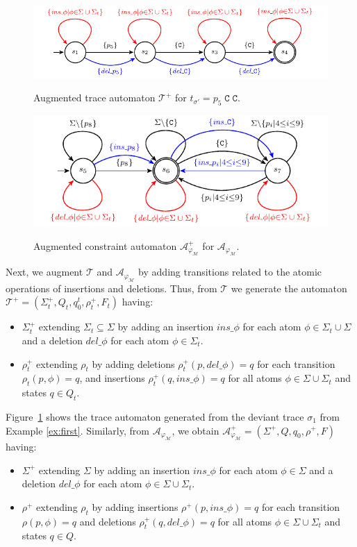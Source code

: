 \begin{figure}[!t]
	\centering
	{\includegraphics[width=.7\textwidth]{images/Tplus}}
	\caption{Augmented trace automaton $\mathcal{T}^+$ for $t_{\sigma'}=p_5\;\texttt{C}\;\texttt{C}$.}\label{fig:tplus}
\end{figure} \begin{figure}[!t]
\centering
{\includegraphics[width=.7\textwidth]{images/Aplus}}
\caption{Augmented constraint automaton $\mathcal{A}_{\varphi_{\mathcal{M}}}^+$ for $\mathcal{A}_{\varphi_{\mathcal{M}}}$.}\label{fig:aplus}
\end{figure}
Next, we augment $\mathcal{T}$ and $\mathcal{A}_{\varphi_{\mathcal{M}}}$ by adding transitions related to the atomic operations of insertions and deletions. Thus, from $\mathcal{T}$ we generate the automaton $\mathcal{T}^+=(\Sigma_t^+,Q_t,q_0^t,\rho_t^+,F_t)$ having:
\begin{itemize}
	\item $\Sigma_t^+$ extending $\Sigma_t\subseteq \Sigma$ by adding an insertion $\textit{ins\_}\phi$ for each atom $\phi\in\Sigma_t\cup\Sigma$ and a deletion $\textit{del\_}\phi$ for each atom  $\phi\in\Sigma_t$.
	\item $\rho_t^+$ extending $\rho_t$ by adding deletions $\rho_t^+(p,\textit{del\_}\phi)=q$ for each transition $\rho_t(p,\phi)=q$, and insertions $\rho_t^+(q,\textit{ins\_}\phi)=q$ for all atoms $\phi\in\Sigma\cup\Sigma_t$ and states $q\in Q_t$.
\end{itemize}
Figure~\ref{fig:tplus} shows the trace automaton generated from the deviant trace $\sigma_1$ from Example \ref{ex:first}. Similarly, from $\mathcal{A}_{\varphi_{\mathcal{M}}}$, we obtain $\mathcal{A}_{\varphi_{\mathcal{M}}}^+=(\Sigma^+,Q,q_0,\rho^+,F)$ having:
\begin{itemize}
	\item $\Sigma^+$ extending $\Sigma$ by adding an insertion $\textit{ins\_}\phi$ for each atom $\phi\in\Sigma$ and a deletion $\textit{del\_}\phi$ for each atom  $\phi\in\Sigma\cup\Sigma_t$.
\item $\rho^+$ extending $\rho_t$ by adding insertions $\rho^+(p,\textit{ins\_}\phi)=q$ for each transition $\rho(p,\phi)=q$ and deletions $\rho_t^+(q,\textit{del\_}\phi)=q$ for all atoms $\phi\in\Sigma\cup\Sigma_t$ and states $q\in Q$.
\end{itemize}
